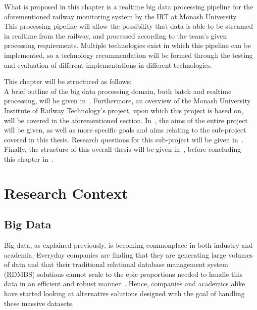 What is proposed in this chapter is a realtime big data processing pipeline for the aforementioned railway monitoring
system by the IRT at Monash University. This processing pipeline will allow the possibility that data is able to be
streamed in realtime from the railway, and processed according to the team's given processing requirements. Multiple
technologies exist in which this pipeline can be implemented, so a technology recommendation will be formed through
the testing and evaluation of different implementations in different technologies.

This chapter will be structured as follows:\\
A brief outline of the big data processing domain, both batch and realtime processing, will be given
in~. Furthermore, an overview of the Monash University Institute of Railway Technology's
project, upon which this project is based on, will be covered in the aforementioned section. In~,
the aims of the entire project will be given, as well as more specific goals and aims relating to the sub-project
covered in this thesis. Research questions for this sub-project will be given in~.
Finally, the structure of this overall thesis will be given in~, before
concluding this chapter in~.




\section{Research Context} %
\label{sec:research_context}

\subsection{Big Data} %
\label{sub:big_data}

Big data, as explained previously, is becoming commonplace in both industry and academia. Everyday companies are finding
that they are generating large volumes of data and that their traditional relational database management system (RDMBS) solutions cannot
scale to the epic proportions needed to handle this data in an efficient and robust manner~\cite{marz2013principles}.
Hence, companies and academics alike have started looking at alternative solutions designed with the goal of handling
these massive datasets.

